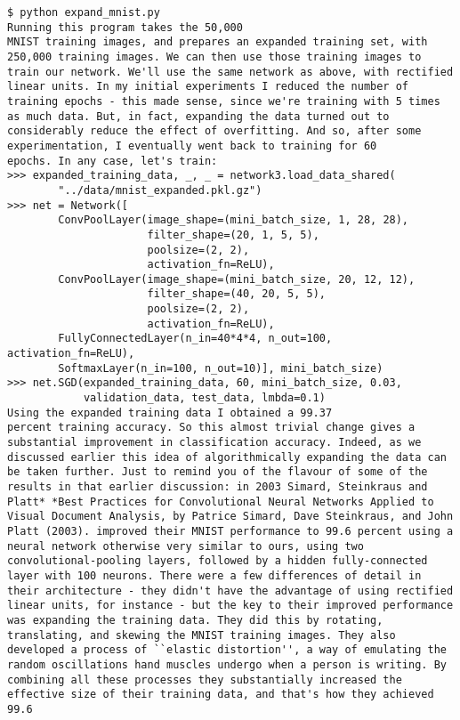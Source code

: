 \begin{lstlisting}
$ python expand_mnist.py
Running this program takes the 50,000
MNIST training images, and prepares an expanded training set, with 250,000 training images. We can then use those training images to train our network. We'll use the same network as above, with rectified linear units. In my initial experiments I reduced the number of training epochs - this made sense, since we're training with 5 times as much data. But, in fact, expanding the data turned out to considerably reduce the effect of overfitting. And so, after some experimentation, I eventually went back to training for 60
epochs. In any case, let's train:
>>> expanded_training_data, _, _ = network3.load_data_shared(
        "../data/mnist_expanded.pkl.gz")
>>> net = Network([
        ConvPoolLayer(image_shape=(mini_batch_size, 1, 28, 28), 
                      filter_shape=(20, 1, 5, 5), 
                      poolsize=(2, 2), 
                      activation_fn=ReLU),
        ConvPoolLayer(image_shape=(mini_batch_size, 20, 12, 12), 
                      filter_shape=(40, 20, 5, 5), 
                      poolsize=(2, 2), 
                      activation_fn=ReLU),
        FullyConnectedLayer(n_in=40*4*4, n_out=100, activation_fn=ReLU),
        SoftmaxLayer(n_in=100, n_out=10)], mini_batch_size)
>>> net.SGD(expanded_training_data, 60, mini_batch_size, 0.03, 
            validation_data, test_data, lmbda=0.1)
Using the expanded training data I obtained a 99.37
percent training accuracy. So this almost trivial change gives a substantial improvement in classification accuracy. Indeed, as we discussed earlier this idea of algorithmically expanding the data can be taken further. Just to remind you of the flavour of some of the results in that earlier discussion: in 2003 Simard, Steinkraus and Platt* *Best Practices for Convolutional Neural Networks Applied to Visual Document Analysis, by Patrice Simard, Dave Steinkraus, and John Platt (2003). improved their MNIST performance to 99.6 percent using a neural network otherwise very similar to ours, using two convolutional-pooling layers, followed by a hidden fully-connected layer with 100 neurons. There were a few differences of detail in their architecture - they didn't have the advantage of using rectified linear units, for instance - but the key to their improved performance was expanding the training data. They did this by rotating, translating, and skewing the MNIST training images. They also developed a process of ``elastic distortion'', a way of emulating the random oscillations hand muscles undergo when a person is writing. By combining all these processes they substantially increased the effective size of their training data, and that's how they achieved 99.6

\end{lstlisting}
